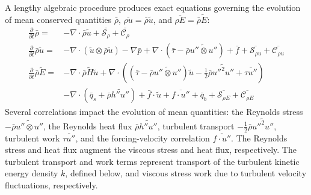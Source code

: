 \documentclass[letterpaper,11pt,nointlimits,reqno,draft]{amsbook}
\newcommand{\Ssd}{\ensuremath{\mathcal{S}}} %
\newcommand{\Cs}{\ensuremath{\mathcal{C}}}  %
\begin{document}
A lengthy algebraic procedure \citep[\textsection{}2]{OliverFANSModels2011}
produces exact equations governing the evolution of mean conserved quantities
$\bar{\rho}$, $\overline{\rho{}u}= \bar{\rho}\tilde{u}$, and
$\overline{\rho{}E} = \bar{\rho}\tilde{E}$:
\begin{subequations}\label{eq:unclosedfansequations}
\begin{align}
    \frac{\partial}{\partial{}t}\bar{\rho}
 =
 &- \nabla\cdot\bar{\rho}\tilde{u}
  + \overline{\Ssd_{\rho{}}}
  + \overline{\Cs_{\rho{}}}
\\
    \frac{\partial{}}{\partial{}t}\bar{\rho}\tilde{u}
 =
 &- \nabla\cdot(\tilde{u}\otimes\bar{\rho}\tilde{u})
  - \nabla{}\bar{p}
  + \nabla\cdot\left(
        \bar{\tau}
      - \bar{\rho}\widetilde{u''\otimes{}u''}
    \right)
  + \bar{f}
  + \overline{\Ssd_{\rho{} u}}
  + \overline{\Cs_{\rho{} u}}
\\
  \frac{\partial}{\partial{}t} \bar{\rho}\tilde{E}
 =
 &- \nabla\cdot{}\bar{\rho}\tilde{H}\tilde{u}
  + \nabla\cdot\left(
        \left(
            \bar{\tau}
          - \bar{\rho} \widetilde{u''\otimes{}u''}
        \right) \tilde{u}
      - \frac{1}{2}\bar{\rho}\widetilde{{u''}^{2}u''}
      + \overline{\tau{}u''}
    \right)
\\
 &- \nabla\cdot\left(
        \bar{q}_s
      + \bar{\rho} \widetilde{h''u''}
    \right)
  + \bar{f}\cdot\tilde{u}
  + \overline{f\cdot{}u''}
  + \bar{q}_{b}
  + \overline{\Ssd_{\rho{} E}}
  + \overline{\Cs_{\rho{} E}}
\end{align}
\end{subequations}
Several correlations impact the evolution of mean quantities: the Reynolds
stress $-\bar{\rho}\widetilde{u''\otimes{}u''}$, the Reynolds heat flux
$\bar{\rho} \widetilde{h''u''}$, turbulent transport
$-\frac{1}{2}\bar{\rho}\widetilde{{u''}^{2}u''}$, turbulent work
$\overline{\tau{}u''}$, and the forcing-velocity correlation
$\overline{f\cdot{}u''}$.  The Reynolds stress and heat flux augment the
viscous stress and heat flux, respectively.  The turbulent transport and work
terms represent transport of the turbulent kinetic energy density $k$, defined
below, and viscous stress work due to turbulent velocity fluctuations,
respectively.
\end{document}
